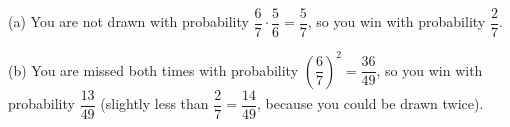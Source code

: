 (a) You are not drawn with probability $\dfrac{6}{7}\cdot\dfrac{5}{6}=\dfrac{5}{7}$, so you win with probability $\boxed{\dfrac{2}{7}}$.

(b) You are missed both times with probability $\left(\dfrac{6}{7}\right)^2=\dfrac{36}{49}$, so you win with probability $\boxed{\dfrac{13}{49}}$ (slightly less than $\dfrac{2}{7}=\dfrac{14}{49}$, because you could be drawn twice).
